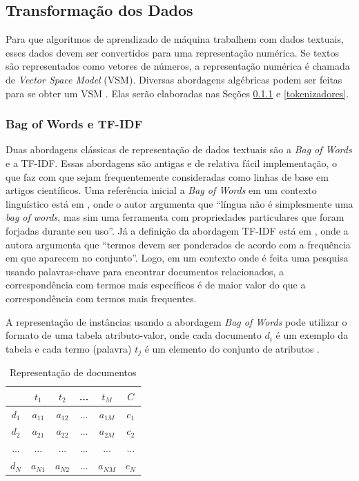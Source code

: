 \subsection{Transformação dos Dados}
Para que algoritmos de aprendizado de máquina trabalhem com dados textuais, esses dados devem ser convertidos para uma representação numérica. Se textos são representados como vetores de números, a representação numérica é chamada de \textit{Vector Space Model} (VSM). Diversas abordagens algébricas podem ser feitas para se obter um VSM \cite{practical_nlp}. Elas serão elaboradas nas Seções \ref{bag of words e tf-idf} e \ref{tokenizadores}.

\subsubsection{Bag of Words e TF-IDF}
\label{bag of words e tf-idf}
Duas abordagens clássicas de representação de dados textuais são a \textit{Bag of Words} e a TF-IDF. Essas abordagens são antigas e de relativa fácil implementação, o que faz com que sejam frequentemente consideradas como linhas de base em artigos científicos. Uma referência inicial a \textit{Bag of Words} em um contexto linguístico está em \cite{bag-of-wordsPaper}, onde o autor argumenta que ``língua não é simplesmente uma \textit{bag of words}, mas sim uma ferramenta com propriedades particulares que foram forjadas durante seu uso''. Já a definição da abordagem TF-IDF está em \cite{tf-idfPaper}, onde a autora argumenta que ``termos devem ser ponderados de acordo com a frequência em que aparecem no conjunto''. Logo, em um contexto onde é feita uma pesquisa usando palavras-chave para encontrar documentos relacionados, a correspondência com termos mais específicos é de maior valor do que a correspondência com termos mais frequentes.

A representação de instâncias usando a abordagem \textit{Bag of Words} pode utilizar o formato de uma tabela atributo-valor, onde cada documento $d_i$ é um exemplo da tabela e cada termo (palavra) $t_j$ é um elemento do conjunto de atributos \cite{bag_of_words}.

\begin{center}
\begin{table}[ht]
\caption{Representação de documentos}
\label{table:representação de documentos}
\centering
    \begin{tabular}{|c | c | c | c | c || c|} 
     \hline
      & $t_1$ & $t_2$ & ... & $t_M$ & $C$ \\ [0.5ex] 
     \hline
     $d_1$ & $a_{11}$ & $a_{12}$ & ... & $a_{1M}$ & $c_1$ \\ 
     \hline
     $d_2$ & $a_{21}$ & $a_{22}$ & ... & $a_{2M}$ & $c_2$ \\
     \hline
     ... & ... & ... & ... & ... & ... \\
     \hline
     $d_N$ & $a_{N1}$ & $a_{N2}$ & ... & $a_{NM}$ & $c_N$ \\
     \hline
    \end{tabular}
\end{table}
\end{center}

